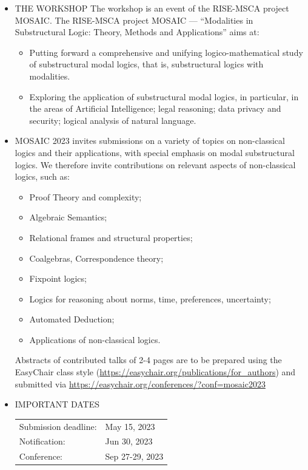 \documentclass[prodmode,acmtecs]{acmsmall} %
\begin{document}
\begin{itemize}\item  THE WORKSHOP   The workshop is an event of the RISE-MSCA project MOSAIC. The RISE-MSCA project MOSAIC — “Modalities in Substructural Logic: Theory, Methods and Applications” aims at: 
 
\begin{itemize}\item  Putting forward a comprehensive and unifying logico-mathematical study of substructural modal logics, that is, substructural logics with modalities.
\item  Exploring the application of substructural modal logics, in particular, in the areas of Artificial  Intelligence; legal reasoning; data privacy and security; logical analysis of natural language.
\end{itemize} 
\item  MOSAIC 2023 invites submissions on a variety of topics on non-classical logics and their applications, with special emphasis on modal substructural logics. We therefore invite contributions on relevant aspects of non-classical logics, such as: 
 
\begin{itemize}\item  Proof Theory and complexity;
\item  Algebraic Semantics;
\item  Relational frames and structural properties;
\item  Coalgebras, Correspondence theory;
\item  Fixpoint logics;
\item  Logics for reasoning about norms, time, preferences, uncertainty;
\item  Automated Deduction;
\item  Applications of non-classical logics.
\end{itemize} 
  Abstracts of contributed talks of 2-4 pages are to be prepared using the EasyChair class style (\href{https://easychair.org/publications/for_authors}{https://easychair.org/publications/for\_authors}) and submitted via \href{https://easychair.org/conferences/?conf=mosaic2023}{https://easychair.org/conferences/?conf=mosaic2023} 
 
\item  IMPORTANT DATES 
 
\begin{tabulary}{\linewidth}{LL}Submission deadline:  & May 15, 2023 \\
Notification:  & Jun 30, 2023 \\
Conference:  & Sep 27-29, 2023 \\
\end{tabulary}
 

\end{itemize}
\end{document}
